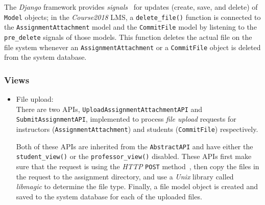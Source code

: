 The \emph{Django} framework provides \emph{signals}~\cite{EdjangoSignal}
for updates (create, save, and delete) of \texttt{Model} objects; in the
\emph{Course2018} LMS, a \texttt{delete\_file()} function is connected to
the \texttt{AssignmentAttachment} model and the \texttt{CommitFile} model by
listening to the \texttt{pre\_delete} signals of those models. This function
deletes the actual file on the file system whenever an
\texttt{AssignmentAttachment} or a \texttt{CommitFile} object is deleted from
the system database.

\subsubsection{Views}
\begin{itemize}
    \item File upload: \\
    There are two APIs, 
    \texttt{Upload\-Assign\-ment\-Attach\-ment\-API} and
    \texttt{Sub\-mit\-Assign\-ment\-API}, 
    implemented to process \emph{file upload} requests
    for instructors (\texttt{Assign\-ment\-Attach\-ment}) and students
    (\texttt{CommitFile}) respectively.

    Both of these APIs are inherited from the 
    \texttt{AbstractAPI} and have either the \texttt{student\_view()}
    or the \texttt{professor\_view()} disabled.
    These APIs first make sure that the request is using the
    \emph{HTTP} \texttt{POST} method~\citep[Section 4.3.3]{http},
    then copy the files in the request to the assignment directory, and use 
    a \emph{Unix} library called \emph{libmagic} \cite{libmagic} to determine
    the file type.
    Finally, a file model object is created and saved to the system database
    for each of the uploaded files.


\begin{figure}[ht]
    \centering
    \usetikzlibrary{er}

\end{figure}
\end{itemize}
